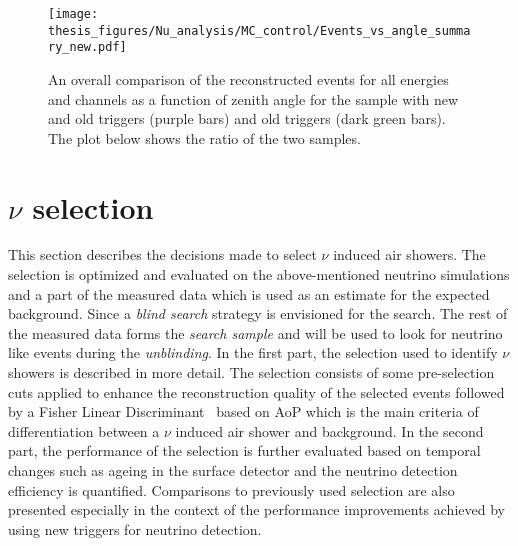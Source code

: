 \begin{figure}[h!]
  \centering
  \texttt{[image: thesis\_figures/Nu\_analysis/MC\_control/Events\_vs\_angle\_summary\_new.pdf]}
  \caption{An overall comparison of the reconstructed events for all energies and channels as a function of zenith angle for the sample with new and old triggers (purple bars) and old triggers (dark green bars). The plot below shows the ratio of the two samples.}
  \label{fig:Events_vs_angle_summary}
\end{figure}

\clearpage
\section{\texorpdfstring{$\nu$}{} selection}
\label{sec:nu_sel}
This section describes the decisions made to select $\nu$ induced air showers. The selection is optimized and evaluated on the above-mentioned neutrino simulations and a part of the measured data which is used as an estimate for the expected background. Since a \textit{blind search} strategy is envisioned for the search. The rest of the measured data forms the \textit{search sample} and will be used to look for neutrino like events during the \textit{unblinding}. 
In the first part, the selection used to identify $\nu$ showers is described in more detail. The selection consists of some pre-selection cuts applied to enhance the reconstruction quality of the selected events followed by a Fisher Linear Discriminant~\cite{Fisher_illustrative} based on AoP which is the main criteria of differentiation between a $\nu$ induced air shower and background.  
In the second part, the performance of the selection is further evaluated based on temporal changes such as ageing in the surface detector and the neutrino detection efficiency is quantified. Comparisons to previously used selection are also presented especially in the context of the performance improvements achieved by using new triggers for neutrino detection.


